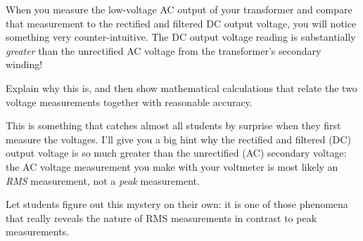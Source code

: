 

When you measure the low-voltage AC output of your transformer and compare that measurement to the rectified and filtered DC output voltage, you will notice something very counter-intuitive.  The DC output voltage reading is substantially {\it greater} than the unrectified AC voltage from the transformer's secondary winding!

Explain why this is, and then show mathematical calculations that relate the two voltage measurements together with reasonable accuracy.







This is something that catches almost all students by surprise when they first measure the voltages.  I'll give you a big hint why the rectified and filtered (DC) output voltage is so much greater than the unrectified (AC) secondary voltage: the AC voltage measurement you make with your voltmeter is most likely an {\it RMS} measurement, not a {\it peak} measurement.







Let students figure out this mystery on their own: it is one of those phenomena that really reveals the nature of RMS measurements in contrast to peak measurements.



